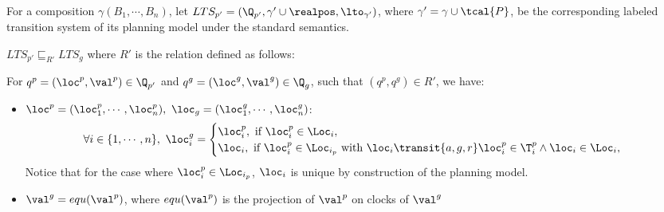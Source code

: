 For a composition $\gamma(B_1,\cdots,B_n)$, let $LTS_{p'}=(\Q_{p'},\gamma'\cup\realpos,\lto_{\gamma'})$, where $\gamma'=\gamma\cup\tcal{P}$, be the corresponding labeled transition system of its planning model under the 
standard semantics.  
\begin{theorem}\label{correctness}
  $LTS_{p'}\sqsubseteq_{R'} LTS_g$ where $R'$ is the relation defined as follows:
 
  For $q^p=(\loc^p,\val^p)\in\Q_{p'}$ and $q^g=(\loc^g,\val^g)\in\Q_g$, such that $(q^p,q^g)\in R'$, we have: 

  \begin{itemize}
    \item $\loc^p=(\loc^p_1,\cdots,\loc^p_n),\ \loc_g=(\loc^g_1,\cdots,\loc^g_n)$:
      \[\forall i\in\{1,\cdots,n\},\ \loc^g_i=\begin{cases}
        \loc^p_i, \text{ if } \loc^p_i\in\Loc_i,\\
        \loc_i, \text{ if } \loc^p_i\in\Loc_{i_p}\text{ with }\loc_i\transit{a,g,r}\loc_i^p\in\T_i^p\wedge\loc_i\in\Loc_i,
    \end{cases} 
      \]
      Notice that for the case where $\loc_i^p\in\Loc_{i_p}$, $\loc_i$ is unique by construction of the planning model.
    \item $\val^g=equ(\val^p)$, where $equ(\val^p)$ is the projection of $\val^p$ on clocks of $\val^g$ 
  \end{itemize}
 
  \end{theorem}
